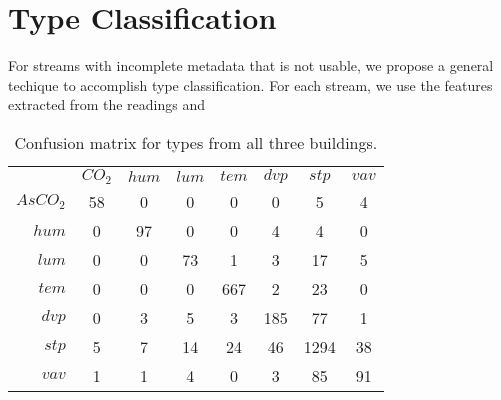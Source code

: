 \section{Type Classification}
For streams with incomplete metadata that is not usable, we propose a general techique to accomplish type classification. For each stream, we use the features extracted from the readings and 


\begin{table}[h!]
 \begin{center}
	\begin{tabular}{ r|c|c|c|c|c|c|c| }
	\multicolumn{1}{r}{}
	 &  \multicolumn{1}{c}{$CO_{2}$}
	 & \multicolumn{1}{c}{$hum$}
	 & \multicolumn{1}{c}{$lum$}
	 & \multicolumn{1}{c}{$tem$}
	  & \multicolumn{1}{c}{$dvp$} 
	  & \multicolumn{1}{c}{$stp$} 
	  & \multicolumn{1}{c}{$vav$} \\
	\cline{2-8} 
	$As CO_{2}$ & 58 & 0 & 0 & 0 & 0 & 5 & 4\\
	\cline{2-8}
	$hum$ & 0 & 97 & 0 & 0 & 4 & 4 & 0\\
	\cline{2-8}
	$lum$ & 0 & 0 & 73 & 1 & 3 & 17 & 5\\
	\cline{2-8}
	$tem$ & 0 & 0 & 0 & 667 & 2 & 23 & 0\\
	\cline{2-8}
	$dvp$ & 0 & 3 & 5 & 3 & 185 & 77 & 1\\
	\cline{2-8}
	$stp$ & 5 & 7 & 14 & 24 & 46 & 1294 & 38\\
	\cline{2-8}
	$vav$ & 1 & 1 & 4 & 0 & 3 & 85 & 91\\
	\cline{2-8}
	\end{tabular}
 \end{center}
 \caption{Confusion matrix for types from all three buildings.}
 \label{tab:cluster}
\end{table}
